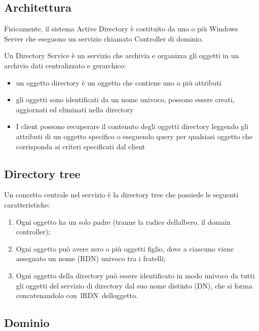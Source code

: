 \documentclass[
]{article}
\providecommand{\tightlist}{%
  \setlength{\itemsep}{0pt}\setlength{\parskip}{0pt}}
\begin{document}
\subsection{\texorpdfstring{{Architettura}}{Architettura}}\label{h.5fn5o7cyexdf}

{Fisicamente, il sistema Active Directory è costituito da uno o più
Windows Server che eseguono un servizio chiamato Controller di dominio.
}

{Un Directory Service è un servizio che archivia e organizza gli oggetti
in un archivio dati centralizzato e gerarchico: }

\begin{itemize}
\tightlist
\item
  {un oggetto directory è un oggetto che contiene uno o più attributi }
\item
  {gli oggetti sono identificati da un nome univoco, possono essere
  creati, aggiornati ed eliminati nella directory }
\item
  {I client possono recuperare il contenuto degli oggetti directory
  leggendo gli attributi di un oggetto specifico o eseguendo query per
  qualsiasi oggetto che corrisponda ai criteri specificati dal client}
\end{itemize}

\subsection{\texorpdfstring{{Directory
tree}}{Directory tree}}\label{h.2cvn0rcw1jb4}

{Un concetto centrale nel servizio è la directory tree che possiede le
seguenti caratteristiche: }

\begin{enumerate}
\tightlist
\item
  {Ogni oggetto ha un solo padre (tranne la radice
  dell\textquotesingle albero, il domain controller); }
\item
  {Ogni oggetto può avere zero o più oggetti }{figlio}{, dove a ciascuno
  viene assegnato un nome (RDN) univoco tra i fratelli; }
\item
  {Ogni oggetto della directory può essere identificato in modo univoco
  da tutti gli oggetti del servizio di directory dal suo nome distinto
  (DN), che si forma }{concatenandolo
  con}{~}{l\textquotesingle RDN}{~dell\textquotesingle oggetto. }
\end{enumerate}

\subsection{\texorpdfstring{{Dominio}}{Dominio}}\label{h.uzsslk8dfc2q}
\end{document}
